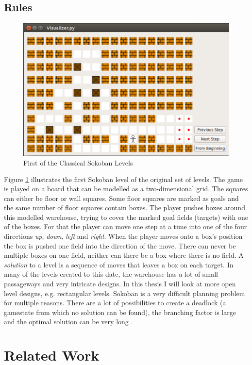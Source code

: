 \documentclass[12pt,a4paper,oneside]{report}
\begin{document}
\section{Rules} \label{IntroStr}
\begin{figure}[ht]
\centering
\includegraphics[scale=0.2]{SokobanLevel1}
\caption{First of the Classical Sokoban Levels}
\label{fig:1}
\end{figure}
Figure \ref{fig:1} illustrates the first Sokoban level of the original set of levels. The game is played on a board that can be modelled as a two-dimensional grid. The squares can either be floor or wall squares. Some floor squares are marked as goals and the same number of floor squares contain boxes. The player pushes boxes around this modelled warehouse, trying to cover the marked goal fields (targets) with one of the boxes. For that the player can move one step at a time into one of the four directions \textit{up}, \textit{down}, \textit{left} and \textit{right}. When the player moves onto a box's position the box is pushed one field into the direction of the move. There can never be multiple boxes on one field, neither can there be a box where there is no field. A \textit{solution} to a level is a sequence of moves that leaves a box on each target.
In many of the levels created to this date, the warehouse has a lot of small passageways and very intricate designs. In this thesis I will look at more open level designs, e.g. rectangular levels.
Sokoban is a very difficult planning problem for multiple reasons. There are a lot of possibilities to create a deadlock (a gamestate from which no solution can be found), the branching factor is large and the optimal solution can be very long \cite{BoteaHeuristicsVsPlanning}.
\chapter{Related Work}
\end{document}
